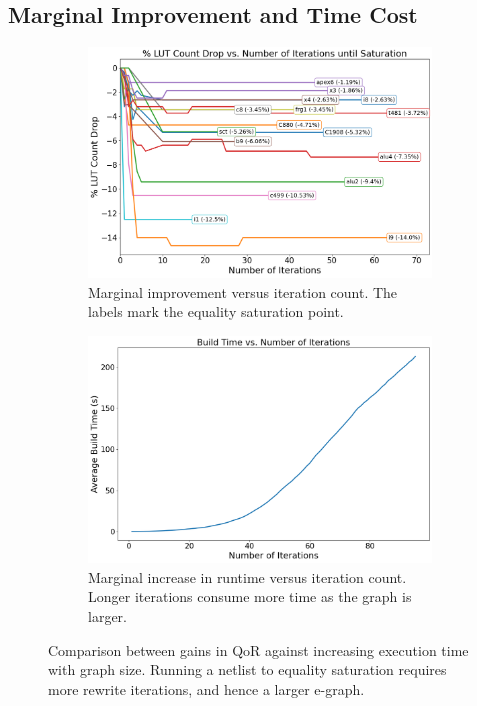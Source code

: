 \subsection{Marginal Improvement and Time Cost}\label{sec:results:margin}
\begin{figure}
    \begin{subfigure}{0.47\textwidth}
        \centering
        \includegraphics[width=\textwidth]{img/improvement.png}
        \caption{Marginal improvement versus iteration count. The labels mark the equality saturation point.}\label{fig:marginal:improvement}
        \Description[]{}
    \end{subfigure}
    \hfill\vspace{4mm}
    \begin{subfigure}{0.47\textwidth}
        \centering
        \includegraphics[width=\textwidth]{img/runtime.png}
        \caption{Marginal increase in runtime versus iteration count. Longer iterations consume more time as the graph is larger.}\label{fig:marginal:runtime}
        \Description[]{}
    \end{subfigure}
    \caption{Comparison between gains in QoR against increasing execution time with graph size. Running a netlist to equality saturation requires more rewrite iterations, and hence a larger e-graph.}\label{fig:marginal}
    \Description[]{}
\end{figure}

